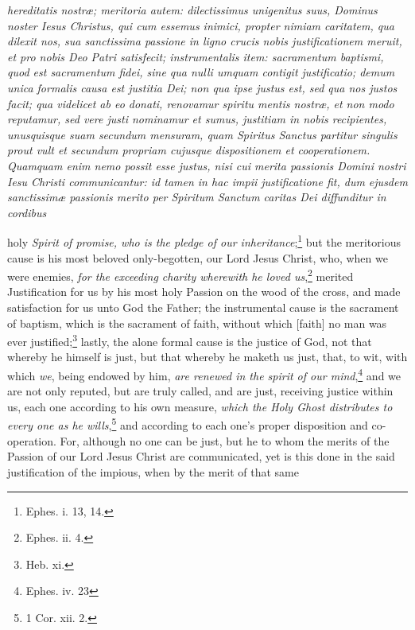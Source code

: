 \emph{hereditatis nostræ; meritoria autem: dilectissimus unigenitus suus, Dominus noster Iesus Christus, qui cum essemus inimici, propter nimiam caritatem, qua dilexit nos, sua sanctissima passione in ligno crucis nobis justificationem meruit, et pro nobis Deo Patri satisfecit; instrumentalis item: sacramentum baptismi, quod est sacramentum fidei, sine qua nulli umquam contigit justificatio; demum unica formalis causa est justitia Dei; non qua ipse justus est, sed qua nos justos facit; qua videlicet ab eo donati, renovamur spiritu mentis nostræ, et non modo reputamur, sed vere justi nominamur et sumus, justitiam in nobis recipientes, unusquisque suam secundum mensuram, quam Spiritus Sanctus partitur singulis prout vult et secundum propriam cujusque dispositionem et cooperationem. Quamquam enim nemo possit esse justus, nisi cui merita passionis Domini nostri Iesu Christi communicantur: id tamen in hac impii justificatione fit, dum ejusdem sanctissimæ passionis merito per Spiritum Sanctum caritas Dei diffunditur in cordibus }

holy \emph{Spirit of promise, who is the pledge of our inheritance};\footnote{\par   Ephes. i. 13, 14.} but the meritorious cause is his most beloved only-begotten, our Lord Jesus Christ, who, when we were enemies, \emph{for the exceeding charity wherewith he loved us},\footnote{\par   Ephes. ii. 4.} merited Justification for us by his most holy Passion on the wood of the cross, and made satisfaction for us unto God the Father; the instrumental cause is the sacrament of baptism, which is the sacrament of faith, without which [faith] no man was ever justified;\footnote{\par   Heb. xi.} lastly, the alone formal cause is the justice of God, not that whereby he himself is just, but that whereby he maketh us just, that, to wit, with which \emph{we}, being endowed by him, \emph{are renewed in the spirit of our mind},\footnote{\par   Ephes. iv. 23} and we are not only reputed, but are truly called, and are just, receiving justice within us, each one according to his own measure, \emph{which the Holy Ghost distributes to every one as he wills},\footnote{\par   1 Cor. xii. 2.} and according to each one's proper disposition and co-operation. For, although no one can be just, but he to whom the merits of the Passion of our Lord Jesus Christ are communicated, yet is this done in the said justification of the impious, when by the merit of that same

